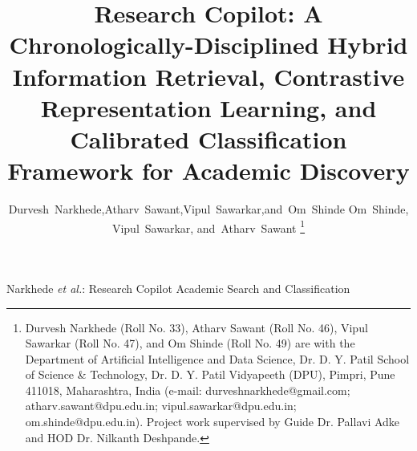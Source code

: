 \documentclass[journal]{IEEEtran}
\begin{document}
\title{Research Copilot: A Chronologically-Disciplined Hybrid Information Retrieval, Contrastive Representation Learning, and Calibrated Classification Framework for Academic Discovery}

\author{Durvesh~Narkhede,\n        Atharv~Sawant,\n        Vipul~Sawarkar,\n        and~Om~Shinde%
        Om~Shinde,
        Vipul~Sawarkar,
        and~Atharv~Sawant%
\thanks{Durvesh Narkhede (Roll No. 33), Atharv Sawant (Roll No. 46), Vipul Sawarkar (Roll No. 47), and Om Shinde (Roll No. 49) are with the Department of Artificial Intelligence and Data Science, Dr. D. Y. Patil School of Science \& Technology, Dr. D. Y. Patil Vidyapeeth (DPU), Pimpri, Pune 411018, Maharashtra, India (e-mail: durveshnarkhede@gmail.com; atharv.sawant@dpu.edu.in; vipul.sawarkar@dpu.edu.in; om.shinde@dpu.edu.in). Project work supervised by Guide Dr. Pallavi Adke and HOD Dr. Nilkanth Deshpande.}}

%
{Narkhede \MakeLowercase{\textit{et al.}}: Research Copilot Academic Search and Classification}

\maketitle
\end{document}
